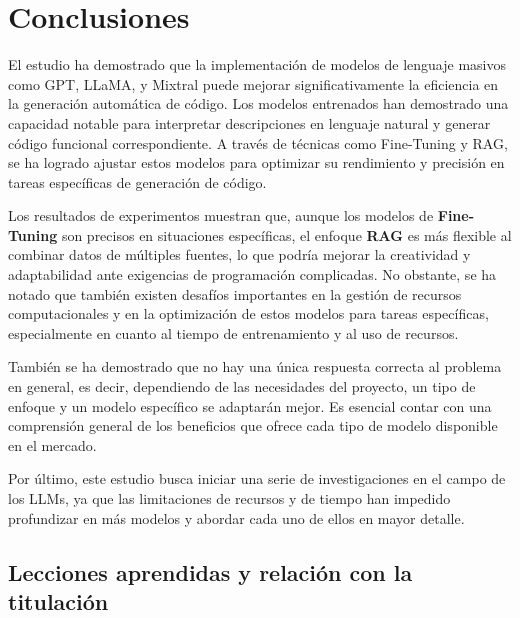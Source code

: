 \chapter{Conclusiones}
\label{chap:conclusions}

\lettrine{E}{}l estudio ha demostrado que la implementación de modelos de lenguaje masivos como \acrshort{GPT}, \acrshort{LLaMA}, y Mixtral puede mejorar significativamente la eficiencia en la generación automática de código. Los modelos entrenados han demostrado una capacidad notable para interpretar descripciones en lenguaje natural y generar código funcional correspondiente. A través de técnicas como Fine-Tuning y \acrfull{RAG}, se ha logrado ajustar estos modelos para optimizar su rendimiento y precisión en tareas específicas de generación de código.

\bigskip %

Los resultados de experimentos muestran que, aunque los modelos de \textbf{Fine-Tuning} son precisos en situaciones específicas, el enfoque \textbf{\acrshort{RAG}} es más flexible al combinar datos de múltiples fuentes, lo que podría mejorar la creatividad y adaptabilidad ante exigencias de programación complicadas. No obstante, se ha notado que también existen desafíos importantes en la gestión de recursos computacionales y en la optimización de estos modelos para tareas específicas, especialmente en cuanto al tiempo de entrenamiento y al uso de recursos.

\bigskip %

También se ha demostrado que no hay una única respuesta correcta al problema en general, es decir, dependiendo de las necesidades del proyecto, un tipo de enfoque y un modelo específico se adaptarán mejor. Es esencial contar con una comprensión general de los beneficios que ofrece cada tipo de modelo disponible en el mercado.

\bigskip %

Por último, este estudio busca iniciar una serie de investigaciones en el campo de los \acrshort{LLMs}, ya que las limitaciones de recursos y de tiempo han impedido profundizar en más modelos y abordar cada uno de ellos en mayor detalle.

\newpage
\section{Lecciones aprendidas y relación con la titulación}


